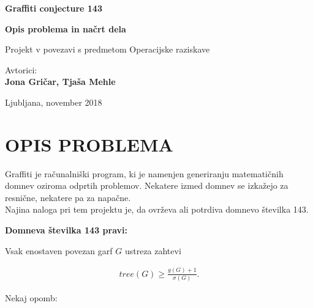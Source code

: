 \documentclass[11pt, a4paper]{article}
\begin{document}
\begin{titlepage}
\begin{center}


\Huge 
\textbf{Graffiti conjecture 143}

\vspace{0,5cm}
\Large
\textbf{Opis problema in načrt dela}

\vspace{0,5cm}
\large
Projekt v povezavi s predmetom Operacijske raziskave


\vspace{3cm}
\large
Avtorici:\\
\textbf{Jona Gričar, Tjaša Mehle}\\

\vfill

\Large Ljubljana, november 2018
\end{center}
\end{titlepage}


\newpage
\section{\textbf{OPIS PROBLEMA}}

\vspace{0,5cm}

Graffiti je računalniški program, ki je namenjen generiranju matematičnih domnev oziroma odprtih problemov. Nekatere izmed domnev se izkažejo za resnične, nekatere pa za napačne. \\ Najina naloga pri tem projektu je, da ovrževa ali potrdiva domnevo številka 143.

\vspace{0,5cm}

\noindent \textbf{Domneva številka 143 pravi:}

\vspace{0,5cm}

\noindent  Vsak enostaven povezan garf $G$ ustreza zahtevi

\begin{align*}
tree(G) \geq \frac{g(G) + 1}{\sigma(G)}.
\end{align*}

\vspace{0,5cm}

\noindent Nekaj opomb:
\end{document}
